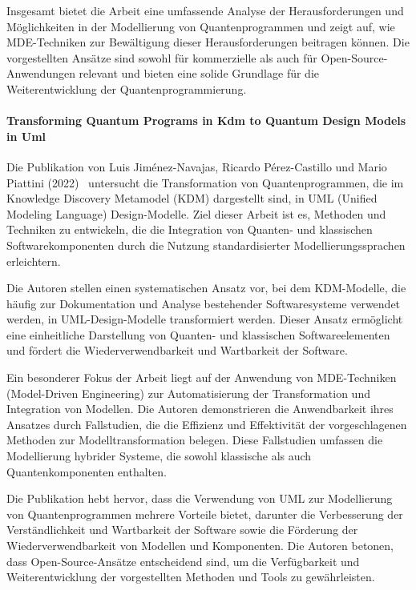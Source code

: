 Insgesamt bietet die Arbeit eine umfassende Analyse der Herausforderungen und Möglichkeiten in der Modellierung 
von Quantenprogrammen und zeigt auf, wie MDE-Techniken zur Bewältigung dieser Herausforderungen beitragen können. 
Die vorgestellten Ansätze sind sowohl für kommerzielle als auch für Open-Source-Anwendungen relevant und bieten 
eine solide Grundlage für die Weiterentwicklung der Quantenprogrammierung.

\paragraph{Transforming Quantum Programs in Kdm to Quantum Design Models in Uml}

Die Publikation von Luis Jiménez-Navajas, Ricardo Pérez-Castillo und Mario Piattini (2022)~\cite{Jimenez-Navajas_2022} untersucht die 
Transformation von Quantenprogrammen, die im Knowledge Discovery Metamodel (KDM) dargestellt sind, in 
UML (Unified Modeling Language) Design-Modelle. Ziel dieser Arbeit ist es, Methoden und Techniken zu 
entwickeln, die die Integration von Quanten- und klassischen Softwarekomponenten durch die Nutzung 
standardisierter Modellierungssprachen erleichtern.

Die Autoren stellen einen systematischen Ansatz vor, bei dem KDM-Modelle, die häufig zur Dokumentation und 
Analyse bestehender Softwaresysteme verwendet werden, in UML-Design-Modelle transformiert werden. Dieser Ansatz 
ermöglicht eine einheitliche Darstellung von Quanten- und klassischen Softwareelementen und fördert die 
Wiederverwendbarkeit und Wartbarkeit der Software.

Ein besonderer Fokus der Arbeit liegt auf der Anwendung von MDE-Techniken (Model-Driven Engineering) zur Automatisierung 
der Transformation und Integration von Modellen. Die Autoren demonstrieren die Anwendbarkeit ihres Ansatzes durch 
Fallstudien, die die Effizienz und Effektivität der vorgeschlagenen Methoden zur Modelltransformation belegen. 
Diese Fallstudien umfassen die Modellierung hybrider Systeme, die sowohl klassische als auch Quantenkomponenten enthalten.

Die Publikation hebt hervor, dass die Verwendung von UML zur Modellierung von Quantenprogrammen mehrere Vorteile 
bietet, darunter die Verbesserung der Verständlichkeit und Wartbarkeit der Software sowie die Förderung der 
Wiederverwendbarkeit von Modellen und Komponenten. Die Autoren betonen, dass Open-Source-Ansätze entscheidend sind, um 
die Verfügbarkeit und Weiterentwicklung der vorgestellten Methoden und Tools zu gewährleisten.

